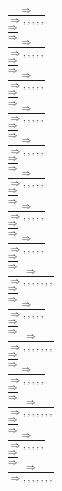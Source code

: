 \documentclass[11pt]{article}
\begin{document}
\begin{center}
\bigskip
\\$\frac{\Rightarrow }{\Rightarrow , , , , , }$
\bigskip
\\$\frac{\Rightarrow }{\Rightarrow }$
\bigskip
\\$\frac{\Rightarrow }{\Rightarrow , , , , , }$
\bigskip
\\$\frac{\Rightarrow }{\Rightarrow }$
\bigskip
\\$\frac{\Rightarrow }{\Rightarrow , , , , , }$
\bigskip
\\$\frac{\Rightarrow }{\Rightarrow }$
\bigskip
\\$\frac{\Rightarrow }{\Rightarrow , , , , , }$
\bigskip
\\$\frac{\Rightarrow }{\Rightarrow }$
\bigskip
\\$\frac{\Rightarrow }{\Rightarrow , , , , , }$
\bigskip
\\$\frac{\Rightarrow }{\Rightarrow }$
\bigskip
\\$\frac{\Rightarrow }{\Rightarrow , , , , , }$
\bigskip
\\$\frac{\Rightarrow }{\Rightarrow }$
\bigskip
\\$\frac{\Rightarrow }{\Rightarrow , , , , , }$
\bigskip
\\$\frac{\Rightarrow }{\Rightarrow }$
\bigskip
\\$\frac{\Rightarrow }{\Rightarrow , , , , , }$
\bigskip
\\$\frac{\Rightarrow }{\Rightarrow }$
\bigskip
\\$\frac{\Rightarrow }{\Rightarrow , , , , , , , }$
\bigskip
\\$\frac{\Rightarrow }{\Rightarrow }$
\bigskip
\\$\frac{\Rightarrow }{\Rightarrow , , , , , }$
\bigskip
\\$\frac{\Rightarrow }{\Rightarrow }$
\bigskip
\\$\frac{\Rightarrow }{\Rightarrow , , , , , , , }$
\bigskip
\\$\frac{\Rightarrow }{\Rightarrow }$
\bigskip
\\$\frac{\Rightarrow }{\Rightarrow , , , , , }$
\bigskip
\\$\frac{\Rightarrow }{\Rightarrow }$
\bigskip
\\$\frac{\Rightarrow }{\Rightarrow , , , , , , , }$
\bigskip
\\$\frac{\Rightarrow }{\Rightarrow }$
\bigskip
\\$\frac{\Rightarrow }{\Rightarrow , , , , , }$
\bigskip
\\$\frac{\Rightarrow }{\Rightarrow }$
\bigskip
\\$\frac{\Rightarrow }{\Rightarrow , , , , , , , }$

\end{center}
\end{document}
